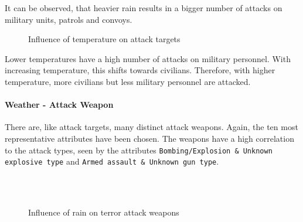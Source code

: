 It can be observed, that heavier rain results in a bigger number of attacks on military units, patrols and convoys.


\newpage

\begin{figure}[!ht]
\centering
    \qquad
    \qquad
    \qquad
    \qquad
    \qquad
\caption{Influence of temperature on attack targets}
\label{fig:example subfigure}
\end{figure}

Lower temperatures have a high number of attacks on military personnel. With increasing temperature, this shifts towards civilians. Therefore, with higher temperature, more civilians but less military personnel are attacked. 

\newpage

\paragraph{Weather - Attack Weapon}
There are, like attack targets, many distinct attack weapons. Again, the ten most representative attributes have been chosen. The weapons have a high correlation to the attack types, seen by the attributes \texttt{Bombing/Explosion \& Unknown explosive type} and \texttt{Armed assault \& Unknown gun type}.

\begin{figure}[!ht]
\centering
    \qquad\\
    \qquad
    \qquad\\
    \qquad
\caption{Influence of rain on terror attack weapons}
\end{figure}

